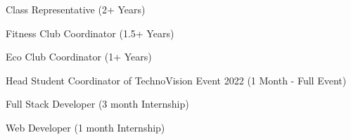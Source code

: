 \documentclass[]{deedy-resume-openfont}
\begin{document}
\begin{minipage}[t]{0.55\textwidth}
\begin{tightemize}
\item Class Representative (2+ Years)
\end{tightemize}
\hspace{\topsep}

\begin{tightemize}
\item Fitness Club Coordinator (1.5+ Years)
\end{tightemize}
\hspace{\topsep}

\begin{tightemize}
\item Eco Club Coordinator (1+ Years)
\end{tightemize}
\hspace{\topsep}

\begin{tightemize}
\item Head Student Coordinator of TechnoVision Event 2022 (1 Month - Full Event)
\end{tightemize}
\hspace{\topsep}

\sectionsep

\sectionsep


\begin{tightemize}
\item Full Stack Developer (3 month Internship)
\end{tightemize}
\hspace{\topsep}

\begin{tightemize}
\item Web Developer (1 month Internship)
\end{tightemize}
\hspace{\topsep}

\sectionsep


\end{minipage} 
\end{document}
